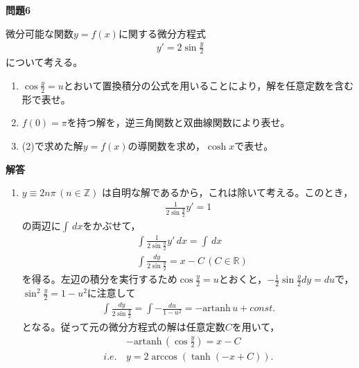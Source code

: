 \documentclass[a4paper,12pt,dvipdfmx,fleqn, oneside]{jsarticle}
\theoremstyle{defstyle}
\theoremstyle{thmx}
\theoremstyle{qesstyle}
\begin{document}
\begin{shadebox}
    \textbf{問題6}

    微分可能な関数$y=f(x)$に関する微分方程式
    \begin{align*}
        y'=2 \sin \frac{y}{2}
    \end{align*}
    について考える。
    \begin{enumerate}
        \item $\cos \frac{y}{2}=u$とおいて置換積分の公式を用いることにより，解を任意定数を含む形で表せ。
        \item $f(0)= \pi $を持つ解を，逆三角関数と双曲線関数により表せ。
        \item (2)で求めた解$y=f(x)$の導関数を求め，$\cosh x$で表せ。
    \end{enumerate}
\end{shadebox}
\begin{screen}
    \textbf{解答}
    \begin{enumerate}
        \item $y \equiv  2n \pi \, (n \in \mathbb{Z})$ は自明な解であるから，これは除いて考える。このとき，
              \begin{align*}
                  \frac{1}{2 \sin \frac{y}{2}} y' = 1
              \end{align*}
              の両辺に$\int \, dx$をかぶせて，
              \begin{align*}
                   & \int \frac{1}{2 \sin \frac{y}{2}} y' \, dx = \int  \, dx         \\
                   & \int \frac{dy}{2 \sin \frac{y}{2}} = x - C \, (C \in \mathbb{R})
              \end{align*}
              を得る。左辺の積分を実行するため$\cos \frac{y}{2} = u$とおくと，$- \frac{1}{2}\sin \frac{y}{2} dy = du$で，$\sin^2 \frac{y}{2} = 1- u^2$に注意して
              \begin{align*}
                  \int \frac{dy}{2 \sin \frac{y}{2}} = \int -\frac{du}{1-u^2} = - \text{artanh}\,  u+ const.
              \end{align*}
              となる。従って元の微分方程式の解は任意定数$C$を用いて，
              \begin{align*}
                         & -\text{artanh} \, (\cos \frac{y}{2})  = x - C             \\
                  i.e.\, & y                             = 2 \arccos (\tanh (-x+C)).
              \end{align*}
    \end{enumerate}
\end{screen}
\end{document}
